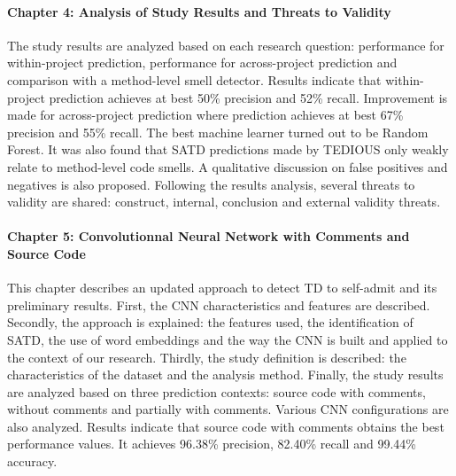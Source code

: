 \paragraph{Chapter 4: Analysis of Study Results and Threats to Validity}
The study results are analyzed based on each research question: performance for within-project prediction, performance for across-project prediction and comparison with a method-level smell detector. Results indicate that within-project prediction achieves at best 50\% precision and 52\% recall. Improvement is made for across-project prediction where prediction achieves at best 67\% precision and 55\% recall. The best machine learner turned out to be Random Forest. It was also found that \ac{SATD} predictions made by \ac{TEDIOUS} only weakly relate to method-level code smells. A qualitative discussion on false positives and negatives is also proposed. Following the results analysis, several threats to validity are shared: construct, internal, conclusion and external validity threats.

\paragraph{Chapter 5: Convolutionnal Neural Network with Comments and Source Code} This chapter describes an updated approach to detect \ac{TD} to self-admit and its preliminary results. First, the \ac{CNN} characteristics and features are described. Secondly, the approach is explained: the features used, the identification of \ac{SATD}, the use of word embeddings and the way the \ac{CNN} is built and applied to the context of our research. Thirdly, the study definition is described: the characteristics of the dataset and the analysis method. Finally, the study results are analyzed based on three prediction contexts: source code with comments, without comments and partially with comments. Various \ac{CNN} configurations are also analyzed. Results indicate that source code with comments obtains the best performance values. It achieves 96.38\% precision, 82.40\% recall and 99.44\% accuracy.









